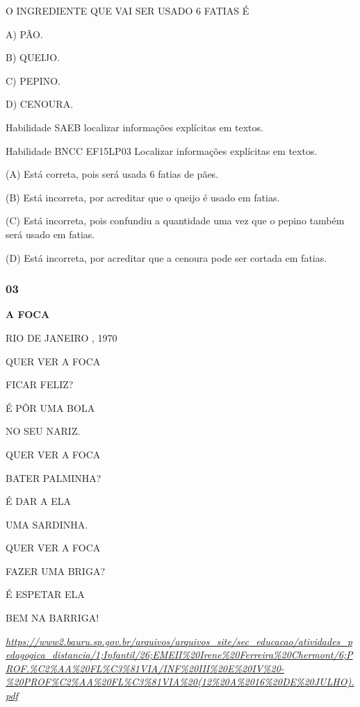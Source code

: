 \begin{escola}
O INGREDIENTE QUE VAI SER USADO 6 FATIAS É

A) PÃO.

B) QUEIJO.

C) PEPINO.

D) CENOURA.

Habilidade SAEB localizar informações explícitas em textos.

Habilidade BNCC EF15LP03 Localizar informações explícitas em textos.

(A) Está correta, pois será usada 6 fatias de pães.

(B) Está incorreta, por acreditar que o queijo é usado em fatias.

(C) Está incorreta, pois confundiu a quantidade uma vez que o pepino
também será usado em fatias.

(D) Está incorreta, por acreditar que a cenoura pode ser cortada em
fatias.

\subsubsection{03}\label{section-10}

\textbf{A FOCA}

RIO DE JANEIRO , 1970

QUER VER A FOCA

FICAR FELIZ?

É PÔR UMA BOLA

NO SEU NARIZ.

QUER VER A FOCA

BATER PALMINHA?

É DAR A ELA

UMA SARDINHA.

QUER VER A FOCA

FAZER UMA BRIGA?

É ESPETAR ELA

BEM NA BARRIGA!

\href{https://www2.bauru.sp.gov.br/arquivos/arquivos_site/sec_educacao/atividades_pedagogica_distancia/1;Infantil/26;EMEII\%20Irene\%20Ferreira\%20Chermont/6;PROF.\%C2\%AA\%20FL\%C3\%81VIA/INF\%20III\%20E\%20IV\%20-\%20PROF\%C2\%AA\%20FL\%C3\%81VIA\%20(12\%20A\%2016\%20DE\%20JULHO).pdf}{\emph{https://www2.bauru.sp.gov.br/arquivos/arquivos\_site/sec\_educacao/atividades\_pedagogica\_distancia/1;Infantil/26;EMEII\%20Irene\%20Ferreira\%20Chermont/6;PROF.\%C2\%AA\%20FL\%C3\%81VIA/INF\%20III\%20E\%20IV\%20-\%20PROF\%C2\%AA\%20FL\%C3\%81VIA\%20(12\%20A\%2016\%20DE\%20JULHO).pdf}}


\end{escola}
